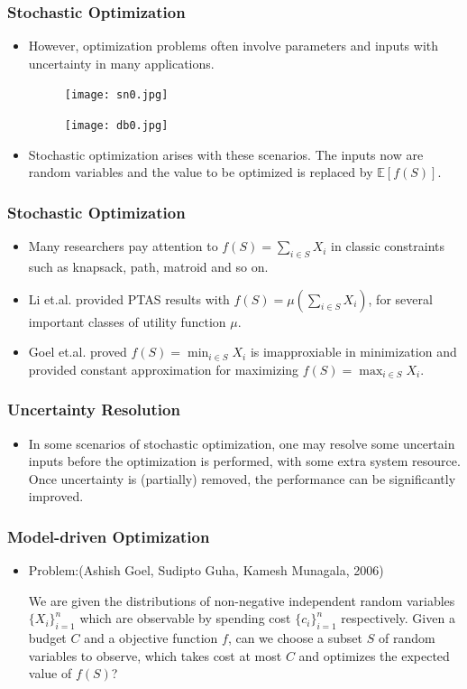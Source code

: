 \documentclass[serif,envcountsect]{beamer}
\newcommand{\Exp}{{\mathbb{E}}}
\begin{document}
\begin{frame}\frametitle{Stochastic Optimization}
\begin{itemize}
\item However, optimization problems often involve parameters and inputs with uncertainty in many applications.
\begin{figure}
\begin{minipage}[t]{0.5\textwidth}
\centering
\texttt{[image: sn0.jpg]}
\end{minipage}%
\begin{minipage}[t]{0.5\textwidth}
\centering
\texttt{[image: db0.jpg]}
\end{minipage}
\end{figure}
\item Stochastic optimization arises with these scenarios. The inputs now are random variables and the value to be optimized is replaced by $\Exp[f(S)]$.
\end{itemize}
\end{frame}

\begin{frame}\frametitle{Stochastic Optimization}
\begin{itemize}
\item Many researchers pay attention to $f(S) = \sum_{i\in S} X_i$ in classic constraints such as knapsack, path, matroid and so on.
\item Li et.al. provided PTAS results with $f(S) = \mu(\sum_{i \in S} X_i)$, for several important classes of utility function $\mu$.
\item Goel et.al. proved $f(S) = \min_{i\in S} X_i$ is imapproxiable in minimization and provided constant approximation for maximizing $f(S) = \max_{i\in S} X_i$.
\end{itemize}
\end{frame}

\begin{frame}\frametitle{Uncertainty Resolution}
\begin{itemize}
\item In some scenarios of stochastic optimization, one may resolve some uncertain inputs before the optimization is performed, with some extra system resource. Once uncertainty is (partially) removed, the performance can be significantly improved.
\end{itemize}
\end{frame}

\begin{frame}\frametitle{Model-driven Optimization}
\begin{itemize}
\item Problem:(Ashish Goel, Sudipto Guha, Kamesh Munagala, 2006)

We are given the distributions of non-negative independent random variables $\{X_i\}_{i=1}^n$ which are observable by spending cost $\{c_i\}_{i=1}^n$ respectively. Given a budget $C$ and a objective function $f$, can we choose a subset $S$ of random variables to observe, which takes cost at most $C$ and optimizes the expected value of $f(S)$?
\end{itemize}
\end{frame}
\end{document}
